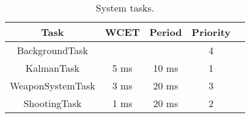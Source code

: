 \begin{table}[H]
\centering
\setlength\extrarowheight{3pt}
\begin{tabulary}{\textwidth}{|C|C|C|C|C|}
\hline
\textbf{Task} & \textbf{WCET} & \textbf{Period} & \textbf{Priority} \\ 
\hline
BackgroundTask            &                           &        & 4        \\
\hline
KalmanTask                & 5 ms                      & 10 ms    & 1      \\
\hline
WeaponSystemTask          & 3 ms                      & 20 ms    & 3      \\
\hline
ShootingTask              & 1 ms                      & 20 ms    & 2      \\
\hline
\end{tabulary}
\caption{System tasks.}
\label{tab:tasks}
\end{table}
\FloatBarrier
